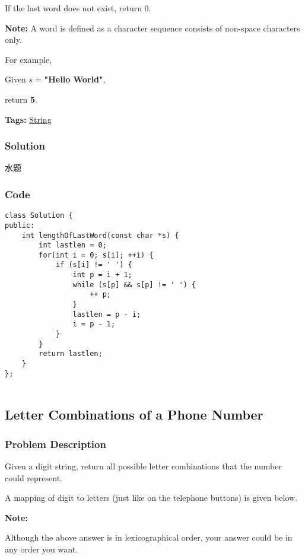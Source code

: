 \documentclass{article}
\begin{document}
\begin{CJK*}{UTF8}{gkai}
If the last word does not exist, return 0.

\textbf{Note:} A word is defined as a character sequence consists of non-space characters only.

For example, 


Given \emph{s} = \textbf{"Hello World"},


return \textbf{5}.


\textbf{Tags: }
\hyperref[ String ]{ String }



\subsubsection*{Solution}
水题

\subsubsection*{Code}
\begin{lstlisting}
class Solution {
public:
    int lengthOfLastWord(const char *s) {
        int lastlen = 0;
        for(int i = 0; s[i]; ++i) {
            if (s[i] != ' ') {
                int p = i + 1;
                while (s[p] && s[p] != ' ') {
                    ++ p;
                }
                lastlen = p - i;
                i = p - 1;
            }
        }
        return lastlen;
    }
};


\end{lstlisting}


\subsection{ Letter Combinations of a Phone Number }
\label{ Letter Combinations of a Phone Number }

\subsubsection*{Problem Description}
Given a digit string, return all possible letter combinations that the number could represent.

A mapping of digit to letters (just like on the telephone buttons) is given below.



\textbf{Note:}


Although the above answer is in lexicographical order, your answer could be in any order you want.


\end{CJK*}
\end{document}
